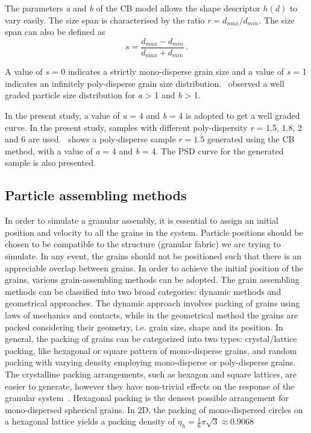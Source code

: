 The parameters \textit{a} and \textit{b} of the CB model allows the shape 
descriptor $h(d)$ to vary easily. The size span is characterised by the ratio $ 
r = d_{max}/d_{min}$. The size span can also be defined as
%
\begin{equation}
s = \frac{d_{max}-d_{min}}{d_{max}+d_{min}} \,.
\end{equation}

A value of \textit{s} = 0 indicates a strictly mono-disperse grain size and a 
value of \textit{s} = 1 indicates an infinitely poly-disperse grain size 
distribution.~\citet{Voivret2007} observed a well graded particle size 
distribution for \textit{a} > 1 and \textit{b} > 1. 

In the present study, a value of \textit{a} = 4 and \textit{b} = 4 is adopted 
to get a well graded curve. In the present study, samples with different 
poly-dispersity \textit{r} = 1.5, 1.8, 2 and 6 are used.~ 
shows a poly-disperse sample $r = 1.5$ generated using the CB method, with a 
value of \textit{a} = 4 and \textit{b} = 4. The PSD curve for the generated 
sample is also presented.


\subsection{Particle assembling methods}
In order to simulate a granular assembly, it is essential to assign an initial 
position and velocity to all the grains in the system. Particle positions 
should be chosen to be compatible to the structure (granular fabric) we are 
trying to simulate. In any event, the grains should not be positioned such that 
there is an appreciable overlap between grains. In order to achieve the initial 
position of the grains, various grain-assembling methods can be adopted. The 
grain assembling methods can be classified into two broad categories: 
dynamic methods and geometrical approaches. The dynamic approach involves 
packing of grains using laws of mechanics and contacts, while in the 
geometrical method the grains are packed considering their geometry, 
i.e. grain size, shape and its position. In general, the packing of grains can 
be categorized into two types: crystal/lattice packing, like hexagonal or 
square pattern of mono-disperse grains, and random packing with varying density 
employing mono-disperse or poly-disperse grains. The crystalline packing 
arrangements, such as hexagon and square lattices, are easier to generate, 
however they have non-trivial effects on the response of the granular 
system~\citep{Staron2005}. Hexagonal packing is the densest possible 
arrangement for mono-dispersed spherical grains. In 2D, the packing of 
mono-dispersed circles on a hexagonal lattice yields a packing density of 
$\eta_{\mathit{h}}=\frac{1}{6}\pi\sqrt{3}\approx 0.9068$



